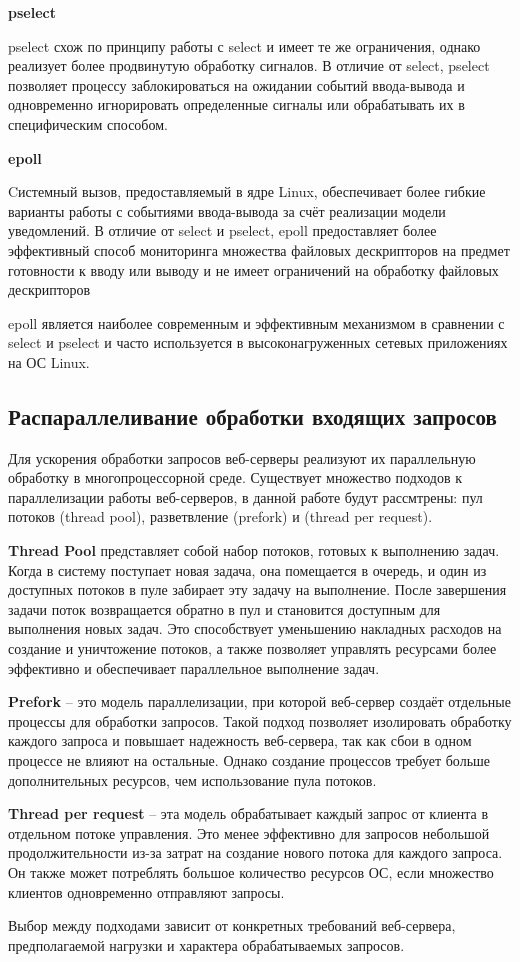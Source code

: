 \textbf{pselect}

pselect схож по принципу работы с select и имеет те же ограничения, однако реализует более продвинутую обработку сигналов. В отличие от select, pselect позволяет процессу заблокироваться на ожидании событий ввода-вывода и одновременно игнорировать определенные сигналы или обрабатывать их в специфическим способом.

\textbf{epoll}

Cистемный вызов, предоставляемый в ядре Linux, обеспечивает более гибкие варианты работы с событиями ввода-вывода за счёт реализации модели уведомлений. В отличие от select и pselect, epoll предоставляет более эффективный способ мониторинга множества файловых дескрипторов на предмет готовности к вводу или выводу и не имеет ограничений на обработку файловых дескрипторов

epoll является наиболее современным и эффективным механизмом в сравнении с select и pselect и часто используется в высоконагруженных сетевых приложениях на ОС Linux.

\subsection{Распараллеливание обработки входящих запросов}
Для ускорения обработки запросов веб-серверы реализуют их параллельную обработку в многопроцессорной среде. Существует множество подходов к параллелизации работы веб-серверов, в данной работе будут рассмтрены: пул потоков (thread pool), разветвление (prefork) и (thread per request).

\textbf{Thread Pool} представляет собой набор потоков, готовых к выполнению
задач. Когда в систему поступает новая задача, она помещается в очередь, и
один из доступных потоков в пуле забирает эту задачу на выполнение. После
завершения задачи поток возвращается обратно в пул и становится доступным
для выполнения новых задач. Это способствует уменьшению накладных расходов на создание и уничтожение потоков, а также позволяет управлять ресурсами более эффективно и обеспечивает параллельное выполнение задач.

\textbf{Prefork} -- это модель параллелизации, при которой веб-сервер создаёт
отдельные процессы для обработки запросов. Такой подход позволяет изолировать обработку каждого запроса и повышает надежность веб-сервера, так как
сбои в одном процессе не влияют на остальные. Однако создание процессов
требует больше дополнительных ресурсов, чем использование пула потоков.


\textbf{Thread per request} -- эта модель обрабатывает каждый запрос от клиента в отдельном потоке управления. Это менее эффективно для запросов небольшой продолжительности из-за затрат на создание нового потока для каждого запроса. Он также может потреблять большое количество ресурсов ОС, если множество клиентов одновременно отправляют запросы.

Выбор между подходами зависит от конкретных требований веб-сервера, предполагаемой нагрузки и характера обрабатываемых запросов.



